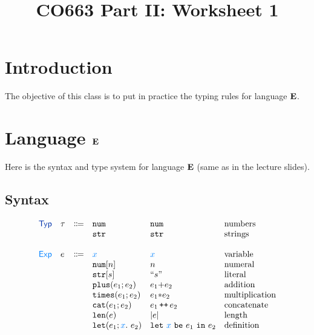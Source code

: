 \documentclass[11pt]{article}
\begin{document}
\title{CO663 Part II: Worksheet 1}

\date{\vspace{-5ex}}
\maketitle


\newcommand{\answerbox}[1]{\framebox{\parbox[c][#1]{\textwidth}{
      \color{white}{h}%
    }}}



\section{Introduction}

The objective of this class is to put in practice the typing rules for
language $\textbf{E}$.
% 

\section{Language $\textbf{E}$}

Here is the syntax and type system for language $\textbf{E}$ (same as in
the lecture slides).

\subsection{Syntax}

  \[
  \begin{array}{llclll}
    \TYPES & \tau & \Coloneqq & \enum{}  & \enum{} & \text{numbers}
    \\
           &&& \estr{} & \estr{} & \text{strings}
    \\
    \\ 
    \EXPS & e & \Coloneqq  & \var{x} & \var{x} & \text{variable}
    \\
           &&& \enum{n} & n & \text{numeral}
    \\
           &&& \estr{s} & \litstr{s} & \text{literal}
    \\
           &&& \eplus{e_1}{e_2} & e_1 {+} e_2 & \text{addition}
    \\
           &&& \etimes{e_1}{e_2} & e_1 {*} e_2 & \text{multiplication}
    \\
           &&& \ecat{e_1}{e_2} & e_1 \concat e_2 & \text{concatenate}
    \\
           &&& \elen{e} & \lvert e \rvert & \text{length}
    \\
           &&& \elet{e_1}{x}{e_2} & \clet{e_1}{x}{e_2} & \text{definition}
  \end{array}
  \]
\end{document}
